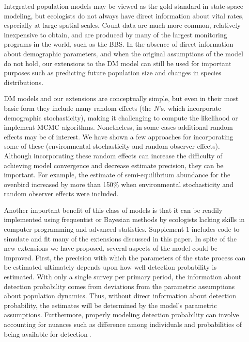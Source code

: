 \documentclass[12pt,english]{article}
\begin{document}
\begin{spacing}{1.9}
\begin{flushleft}
Integrated population models may be viewed as the gold standard in
state-space modeling, but ecologists do not always have direct
information about vital rates, especially at large spatial scales.
Count data are much more common, relatively inexpensive to obtain, and
are produced by many of the largest monitoring programs in the
world, such as the BBS. 
In the absence of direct information about demographic parameters, and
when the original assumptions of the model do not hold, our extensions to the
DM model can still be used for important purposes such as predicting future
population size and changes in species distributions.

DM models and our extensions are conceptually simple, but even in
their most basic form they include many random effects (the $N$'s, which
incorporate demographic stochasticity), making it challenging to compute the likelihood 
or implement MCMC algorithms. Nonetheless, in some cases additional random effects
may be of interest.  We have shown a few approaches for incorporating some of these
(environmental stochasticity and random observer effects).  
Although incorporating these random effects can increase
the difficulty of achieving model convergence and decrease estimate precision, they can be important.
For example, the estimate of semi-equilibrium abundance for the ovenbird increased by more than 150\%
when environmental stochasticity and random observer effects were included.  

Another important benefit of this class of models is that it can be
readily implemented using frequentist or Bayesian methods by
ecologists lacking skills in computer programming and advanced
statistics. Supplement 1 includes code to
simulate and fit many of the extensions discussed in this paper.
In spite of the new extensions we have proposed, several aspects of
the model could be improved. First, the precision with which the
parameters of the state process can be estimated ultimately depends
upon how well detection probability is estimated. With
only a single survey per primary period, the information about
detection probability comes from deviations from the parametric
assumptions about population dynamics. Thus, without direct information
about detection probability, the estimates will be determined by the
model's parametric assumptions. Furthermore, properly modeling detection
probability can involve accounting for nuances such as difference
among individuals and probabilities of being available for detection
\citep{nichols_etal:2009}.


\end{flushleft}
\end{spacing}
\end{document}
